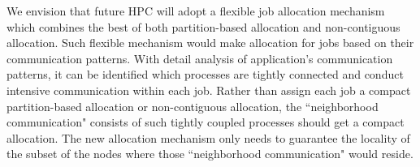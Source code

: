 \documentclass[conference]{IEEEtran}
\begin{document}
%
%
%




We envision that future HPC will adopt a flexible job allocation mechanism which combines the best of both partition-based allocation and non-contiguous allocation. Such flexible mechanism would make allocation for jobs based on their communication patterns. With detail analysis of application's communication patterns, it can be identified which processes are tightly connected and conduct intensive communication within each job. Rather than assign each job a compact partition-based allocation or non-contiguous allocation, the ``neighborhood communication" consists of such tightly coupled processes should get a compact allocation. The new allocation mechanism only needs to guarantee the locality of the subset of the nodes where those ``neighborhood communication" would reside.
\end{document}
